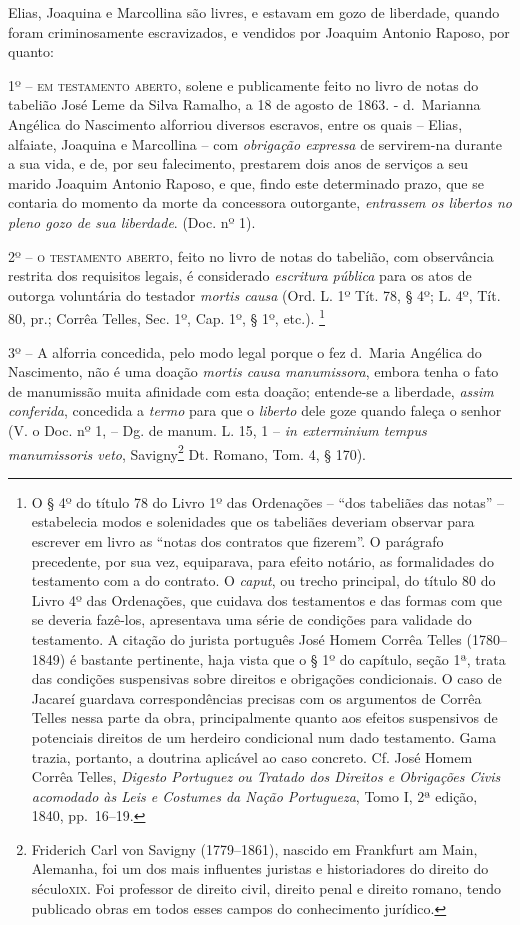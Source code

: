{Elias, Joaquina e Marcollina são livres, e estavam em gozo de liberdade,
quando foram criminosamente escravizados, e vendidos por Joaquim Antonio
Raposo, por quanto:

1º -- \textsc{em testamento aberto}, solene e publicamente feito no livro de
notas do tabelião José Leme da Silva Ramalho, a 18 de agosto de 1863. -
d.~Marianna Angélica do Nascimento alforriou diversos escravos, entre os
quais -- Elias, alfaiate, Joaquina e Marcollina -- com \emph{obrigação
expressa} de servirem-na durante a sua vida, e de, por seu falecimento,
prestarem dois anos de serviços a seu marido Joaquim Antonio Raposo, e
que, findo este determinado prazo, que se contaria do momento da morte
da concessora outorgante, \emph{entrassem os libertos no pleno gozo de
sua liberdade}. (Doc. nº 1).

2º -- \textsc{o testamento aberto}, feito no livro de notas do tabelião, com
observância restrita dos requisitos legais, é considerado
\emph{escritura pública} para os atos de outorga voluntária do testador
\emph{mortis causa} (Ord. L. 1º Tít. 78, § 4º; L. 4º, Tít. 80, pr.;
Corrêa Telles, Sec. 1º, Cap. 1º, § 1º, etc.). \footnote{ O § 4º do
  título 78 do Livro 1º das Ordenações -- ``dos tabeliães das notas'' --
  estabelecia modos e solenidades que os tabeliães deveriam observar
  para escrever em livro as ``notas dos contratos que fizerem''. O
  parágrafo precedente, por sua vez, equiparava, para efeito notário, as
  formalidades do testamento com a do contrato. O \emph{caput}, ou
  trecho principal, do título 80 do Livro 4º das Ordenações, que cuidava
  dos testamentos e das formas com que se deveria fazê-los, apresentava
  uma série de condições para validade do testamento. A citação do
  jurista português José Homem Corrêa Telles (1780--1849) é bastante
  pertinente, haja vista que o § 1º do capítulo, seção 1ª, trata das
  condições suspensivas sobre direitos e obrigações condicionais. O caso
  de Jacareí guardava correspondências precisas com os argumentos de
  Corrêa Telles nessa parte da obra, principalmente quanto aos efeitos
  suspensivos de potenciais direitos de um herdeiro condicional num dado
  testamento. Gama trazia, portanto, a doutrina aplicável ao caso
  concreto. Cf. José Homem Corrêa Telles, \emph{Digesto Portuguez ou
  Tratado dos Direitos e Obrigações Civis acomodado às Leis e Costumes
  da Nação Portugueza}, Tomo I, 2ª edição, 1840, pp.~16--19.}

3º -- A alforria concedida, pelo modo legal porque o fez d.~Maria
Angélica do Nascimento, não é uma doação \emph{mortis causa
manumissora}, embora tenha o fato de manumissão muita afinidade com esta
doação; entende-se a liberdade, \emph{assim conferida}, concedida a
\emph{termo} para que o \emph{liberto} dele goze quando faleça o senhor
(V. o Doc. nº 1, -- Dg. de manum. L. 15, 1 -- \emph{in exterminium
tempus manumissoris veto}, Savigny\footnote{ Friderich Carl von Savigny
  (1779--1861), nascido em Frankfurt am Main, Alemanha, foi um dos mais
  influentes juristas e historiadores do direito do século\textsc{xix}. Foi
  professor de direito civil, direito penal e direito romano, tendo
  publicado obras em todos esses campos do conhecimento jurídico.} Dt.
Romano, Tom. 4, § 170).

}
